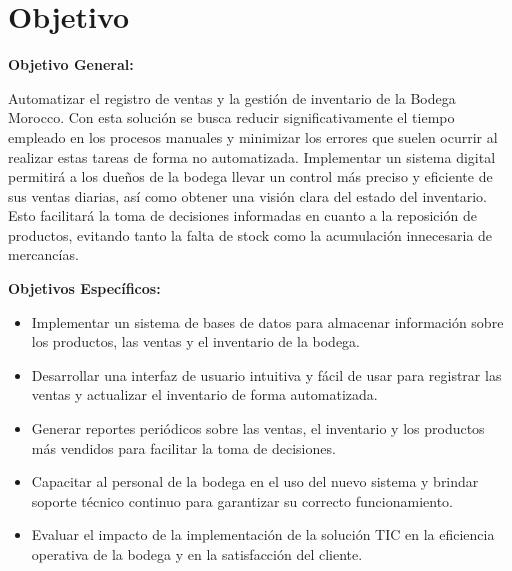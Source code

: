 \documentclass{article}
\newenvironment{objetivo}{}{}
\begin{document}
\begin{objetivo}
  \section{Objetivo}

  \begin{spacing}{1.5}
    \noindent
    \textbf{Objetivo General:} 
    
    Automatizar el registro de ventas y la gestión de inventario de la Bodega Morocco. Con esta solución se busca reducir significativamente el tiempo empleado en los procesos manuales y minimizar los errores que suelen ocurrir al realizar estas tareas de forma no automatizada. Implementar un sistema digital permitirá a los dueños de la bodega llevar un control más preciso y eficiente de sus ventas diarias, así como obtener una visión clara del estado del inventario. Esto facilitará la toma de decisiones informadas en cuanto a la reposición de productos, evitando tanto la falta de stock como la acumulación innecesaria de mercancías.

    \textbf{Objetivos Específicos:}
    \begin{itemize}
      \item Implementar un sistema de bases de datos para almacenar información sobre los productos, las ventas y el inventario de la bodega.
      \item Desarrollar una interfaz de usuario intuitiva y fácil de usar para registrar las ventas y actualizar el inventario de forma automatizada.
      \item Generar reportes periódicos sobre las ventas, el inventario y los productos más vendidos para facilitar la toma de decisiones.
      \item Capacitar al personal de la bodega en el uso del nuevo sistema y brindar soporte técnico continuo para garantizar su correcto funcionamiento.
      \item Evaluar el impacto de la implementación de la solución TIC en la eficiencia operativa de la bodega y en la satisfacción del cliente.
    \end{itemize}
  \end{spacing}
\end{objetivo}

\newpage
\end{document}
